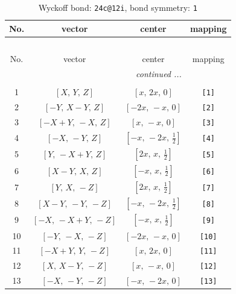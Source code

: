 \documentclass[fleqn,8pt]{jsarticle}
\begin{document}
\begin{longtable}{cccc}
\caption{Wyckoff bond: {\tt 24c@12i}, bond symmetry: {\tt 1}}
 \\
 \hline \hline
No. & vector & center & mapping \\ \hline \endfirsthead

\multicolumn{3}{l}{\tablename\ \thetable{}} \\
 \hline \hline
No. & vector & center & mapping \\ \hline \endhead

 \hline \hline
\multicolumn{3}{r}{\footnotesize\it continued ...} \\ \endfoot

 \hline \hline
\multicolumn{3}{r}{} \\ \endlastfoot

1 & $\left[ X,\, Y,\, Z \right]$ & $\left[ x,\, 2 x,\, 0 \right]$ & {\tt [1]} \\ \hline
2 & $\left[ - Y,\, X - Y,\, Z \right]$ & $\left[ - 2 x,\, - x,\, 0 \right]$ & {\tt [2]} \\ \hline
3 & $\left[ - X + Y,\, - X,\, Z \right]$ & $\left[ x,\, - x,\, 0 \right]$ & {\tt [3]} \\ \hline
4 & $\left[ - X,\, - Y,\, Z \right]$ & $\left[ - x,\, - 2 x,\, \frac{1}{2} \right]$ & {\tt [4]} \\ \hline
5 & $\left[ Y,\, - X + Y,\, Z \right]$ & $\left[ 2 x,\, x,\, \frac{1}{2} \right]$ & {\tt [5]} \\ \hline
6 & $\left[ X - Y,\, X,\, Z \right]$ & $\left[ - x,\, x,\, \frac{1}{2} \right]$ & {\tt [6]} \\ \hline
7 & $\left[ Y,\, X,\, - Z \right]$ & $\left[ 2 x,\, x,\, \frac{1}{2} \right]$ & {\tt [7]} \\ \hline
8 & $\left[ X - Y,\, - Y,\, - Z \right]$ & $\left[ - x,\, - 2 x,\, \frac{1}{2} \right]$ & {\tt [8]} \\ \hline
9 & $\left[ - X,\, - X + Y,\, - Z \right]$ & $\left[ - x,\, x,\, \frac{1}{2} \right]$ & {\tt [9]} \\ \hline
10 & $\left[ - Y,\, - X,\, - Z \right]$ & $\left[ - 2 x,\, - x,\, 0 \right]$ & {\tt [10]} \\ \hline
11 & $\left[ - X + Y,\, Y,\, - Z \right]$ & $\left[ x,\, 2 x,\, 0 \right]$ & {\tt [11]} \\ \hline
12 & $\left[ X,\, X - Y,\, - Z \right]$ & $\left[ x,\, - x,\, 0 \right]$ & {\tt [12]} \\ \hline
13 & $\left[ - X,\, - Y,\, - Z \right]$ & $\left[ - x,\, - 2 x,\, 0 \right]$ & {\tt [13]} \\ \hline

\end{longtable}
\end{document}
